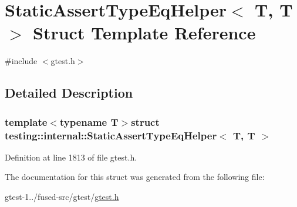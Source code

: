 \hypertarget{structtesting_1_1internal_1_1StaticAssertTypeEqHelper_3_01T_00_01T_01_4}{\section{\-Static\-Assert\-Type\-Eq\-Helper$<$ \-T, \-T $>$ \-Struct \-Template \-Reference}
\label{d8/d1b/structtesting_1_1internal_1_1StaticAssertTypeEqHelper_3_01T_00_01T_01_4}
}


{\ttfamily \#include $<$gtest.\-h$>$}



\subsection{\-Detailed \-Description}
\subsubsection*{template$<$typename T$>$struct testing\-::internal\-::\-Static\-Assert\-Type\-Eq\-Helper$<$ T, T $>$}



\-Definition at line 1813 of file gtest.\-h.



\-The documentation for this struct was generated from the following file\-:\begin{DoxyCompactItemize}
\item 
gtest-\/1../fused-\/src/gtest/\hyperlink{fused-src_2gtest_2gtest_8h}{gtest.\-h}\end{DoxyCompactItemize}
